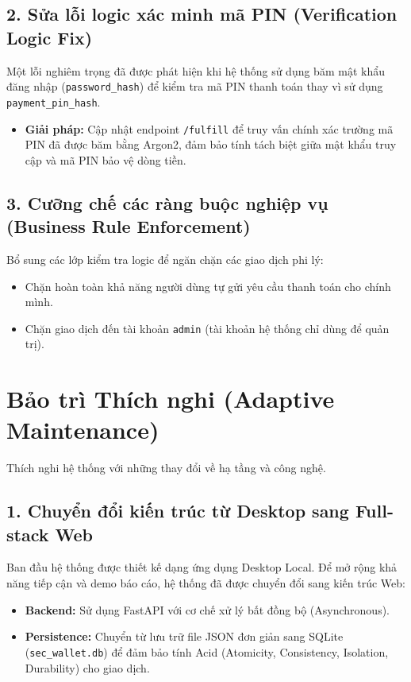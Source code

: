\documentclass[11pt,a4paper]{article}
\begin{document}
\subsection{2. Sửa lỗi logic xác minh mã PIN (Verification Logic Fix)}
Một lỗi nghiêm trọng đã được phát hiện khi hệ thống sử dụng băm mật khẩu đăng nhập (\texttt{password\_hash}) để kiểm tra mã PIN thanh toán thay vì sử dụng \texttt{payment\_pin\_hash}.
\begin{itemize}
    \item \textbf{Giải pháp:} Cập nhật endpoint \texttt{/fulfill} để truy vấn chính xác trường mã PIN đã được băm bằng Argon2, đảm bảo tính tách biệt giữa mật khẩu truy cập và mã PIN bảo vệ dòng tiền.
\end{itemize}

\subsection{3. Cưỡng chế các ràng buộc nghiệp vụ (Business Rule Enforcement)}
Bổ sung các lớp kiểm tra logic để ngăn chặn các giao dịch phi lý:
\begin{itemize}
    \item Chặn hoàn toàn khả năng người dùng tự gửi yêu cầu thanh toán cho chính mình.
    \item Chặn giao dịch đến tài khoản \texttt{admin} (tài khoản hệ thống chỉ dùng để quản trị).
\end{itemize}

\section{Bảo trì Thích nghi (Adaptive Maintenance)}
Thích nghi hệ thống với những thay đổi về hạ tầng và công nghệ.

\subsection{1. Chuyển đổi kiến trúc từ Desktop sang Full-stack Web}
Ban đầu hệ thống được thiết kế dạng ứng dụng Desktop Local. Để mở rộng khả năng tiếp cận và demo báo cáo, hệ thống đã được chuyển đổi sang kiến trúc Web:
\begin{itemize}
    \item \textbf{Backend:} Sử dụng FastAPI với cơ chế xử lý bất đồng bộ (Asynchronous).
    \item \textbf{Persistence:} Chuyển từ lưu trữ file JSON đơn giản sang SQLite (\texttt{sec\_wallet.db}) để đảm bảo tính Acid (Atomicity, Consistency, Isolation, Durability) cho giao dịch.
\end{itemize}
\end{document}
